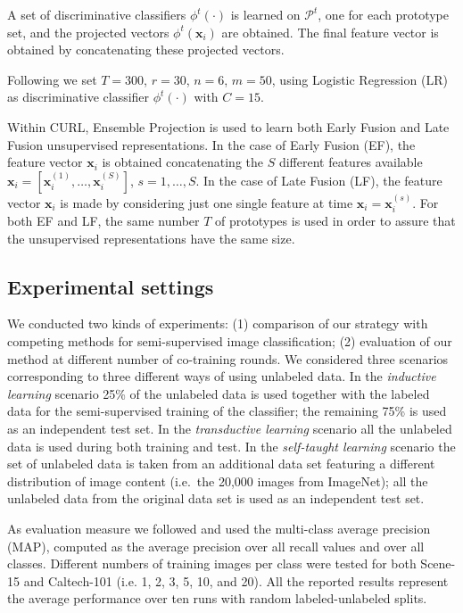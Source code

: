 \documentclass[journal,11pt]{IEEEtran}
\newcommand{\ADD}[1]{#1}
\newcommand{\coso}{strategy}
\begin{document}
A set of discriminative classifiers $\phi^t(\cdot)$ is learned on $\mathcal{P}^t$, one for each prototype set, and the projected vectors $\phi^t(\mathbf{x}_i)$ are obtained. The final feature vector is obtained by concatenating these projected vectors.

Following \cite{dai2013ensemble} we set $T=300$, $r=30$, $n=6$, $m=50$, using Logistic Regression (LR) as discriminative classifier $\phi^t(\cdot)$ with $C=15$. %

\ADD{Within CURL}, Ensemble Projection is used to learn both Early Fusion and Late Fusion unsupervised representations.
In the case of Early Fusion (EF), the feature vector $\mathbf{x}_i$ is obtained concatenating the $S$ different features available $\mathbf{x}_i=[\mathbf{x}_i^{(1)},\ldots,\mathbf{x}_i^{(S)}]$, $s=1,\ldots,S$. In the case of Late Fusion (LF), the feature vector $\mathbf{x}_i$ is made by considering just one single feature at time $\mathbf{x}_i=\mathbf{x}_i^{(s)}$.
For both EF and LF, the same number $T$ of prototypes is used in order to assure that the unsupervised representations have the same size.

\subsection{Experimental settings}
We conducted two kinds of experiments: (1) comparison of our \coso{ }
with competing methods for semi-supervised image classification; (2)
evaluation of our method at different number of co-training rounds.
We considered three scenarios corresponding to three different ways of
using unlabeled data.  In the \emph{inductive learning} scenario 25\%
of the unlabeled data is used together with the labeled data for the
semi-supervised training of the classifier; the remaining 75\% is used
as an independent test set.  In the \emph{transductive learning}
scenario all the unlabeled data is used during both training and test.
In the \emph{self-taught learning} scenario the set of unlabeled data
is taken from an additional data set featuring a different
distribution of image content (i.e.~the 20,000 images from ImageNet);
all the unlabeled data from the original data set is used as an
independent test set.

As evaluation measure we followed \cite{dai2013ensemble} and used the multi-class average precision (MAP),
computed as the average precision over all recall values and over all
classes.  Different numbers of training images per class were tested
for both Scene-15 and Caltech-101 (i.e. 1, 2, 3, 5, 10, and 20).  All the
reported results represent the average performance over ten runs with
random labeled-unlabeled splits.
\end{document}
